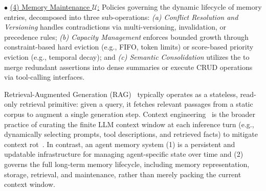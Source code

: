 \noindent $\bullet$ \underline{(4) Memory Maintenance $\mathcal{U}$:} Policies governing the dynamic lifecycle of memory entries, decomposed into three sub-operations: \textit{(a) Conflict Resolution and Versioning} handles contradictions via multi-versioning, invalidation, or precedence rules; \textit{(b) Capacity Management} enforces bounded growth through constraint-based hard eviction (e.g., FIFO, token limits) or score-based priority eviction (e.g., temporal decay); and \textit{(c) Semantic Consolidation} utilizes the \llm to merge redundant assertions into dense summaries or execute CRUD operations via tool-calling interfaces.






Retrieval-Augmented Generation (RAG)~\cite{RAG,khan2026rag} typically operates as a stateless, read-only retrieval primitive: given a query, it fetches relevant passages from a static corpus to augment a single generation step. Context engineering~\cite{anthropic2025context} is the broader practice of curating the finite LLM context window at each inference turn (e.g., dynamically selecting prompts, tool descriptions, and retrieved facts) to mitigate context rot~\cite{anthropic2025context}. In contrast, an agent memory system (1) is a persistent and updatable infrastructure for managing agent-specific state over time and (2) governs the full long-term memory lifecycle, including memory representation, storage, retrieval, and maintenance, rather than merely packing the current context window.


